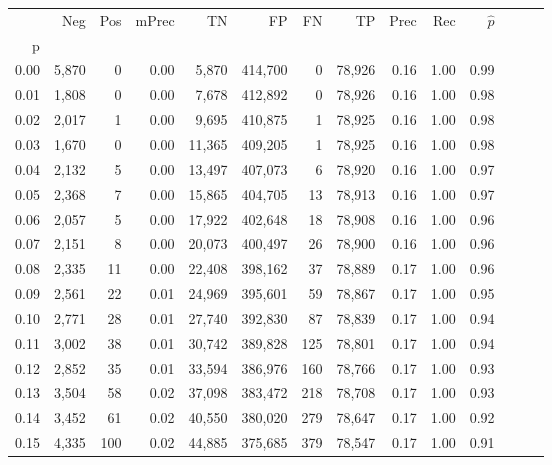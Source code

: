 \begin{tabular}{rrrrrrrrrrrrrr}
\toprule
{} &    Neg &    Pos & mPrec &       TN &       FP &      FN &      TP &  Prec &   Rec & $\hat{p}$ \\
p    &        &        &       &          &          &         &         &       &       &           \\
\midrule
0.00 &  5,870 &      0 &  0.00 &    5,870 &  414,700 &       0 &  78,926 &  0.16 &  1.00 &      0.99 \\
0.01 &  1,808 &      0 &  0.00 &    7,678 &  412,892 &       0 &  78,926 &  0.16 &  1.00 &      0.98 \\
0.02 &  2,017 &      1 &  0.00 &    9,695 &  410,875 &       1 &  78,925 &  0.16 &  1.00 &      0.98 \\
0.03 &  1,670 &      0 &  0.00 &   11,365 &  409,205 &       1 &  78,925 &  0.16 &  1.00 &      0.98 \\
0.04 &  2,132 &      5 &  0.00 &   13,497 &  407,073 &       6 &  78,920 &  0.16 &  1.00 &      0.97 \\
0.05 &  2,368 &      7 &  0.00 &   15,865 &  404,705 &      13 &  78,913 &  0.16 &  1.00 &      0.97 \\
0.06 &  2,057 &      5 &  0.00 &   17,922 &  402,648 &      18 &  78,908 &  0.16 &  1.00 &      0.96 \\
0.07 &  2,151 &      8 &  0.00 &   20,073 &  400,497 &      26 &  78,900 &  0.16 &  1.00 &      0.96 \\
0.08 &  2,335 &     11 &  0.00 &   22,408 &  398,162 &      37 &  78,889 &  0.17 &  1.00 &      0.96 \\
0.09 &  2,561 &     22 &  0.01 &   24,969 &  395,601 &      59 &  78,867 &  0.17 &  1.00 &      0.95 \\
0.10 &  2,771 &     28 &  0.01 &   27,740 &  392,830 &      87 &  78,839 &  0.17 &  1.00 &      0.94 \\
0.11 &  3,002 &     38 &  0.01 &   30,742 &  389,828 &     125 &  78,801 &  0.17 &  1.00 &      0.94 \\
0.12 &  2,852 &     35 &  0.01 &   33,594 &  386,976 &     160 &  78,766 &  0.17 &  1.00 &      0.93 \\
0.13 &  3,504 &     58 &  0.02 &   37,098 &  383,472 &     218 &  78,708 &  0.17 &  1.00 &      0.93 \\
0.14 &  3,452 &     61 &  0.02 &   40,550 &  380,020 &     279 &  78,647 &  0.17 &  1.00 &      0.92 \\
0.15 &  4,335 &    100 &  0.02 &   44,885 &  375,685 &     379 &  78,547 &  0.17 &  1.00 &      0.91 \\

\end{tabular}
